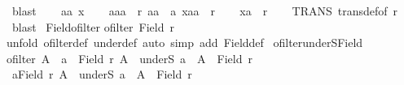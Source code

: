 \begin{isabellebody}
\ blast\isanewline
{}\isamarkupfalse%
\isanewline
\ \ \isamarkupfalse%
\ aa\ x\isanewline
\ \ \isamarkupfalse%
\ {\isachardoublequoteopen}{\isacharparenleft}{\kern0pt}aa{\isacharcomma}{\kern0pt}a{\isacharparenright}{\kern0pt}\ {\isasymin}\ r{\isachardoublequoteclose}\ {\isachardoublequoteopen}aa\ {\isasymnoteq}\ a{\isachardoublequoteclose}\ {\isachardoublequoteopen}{\isacharparenleft}{\kern0pt}x{\isacharcomma}{\kern0pt}aa{\isacharparenright}{\kern0pt}\ {\isasymin}\ r{\isachardoublequoteclose}\isanewline
\ \ \isamarkupfalse%
\ {\isachardoublequoteopen}{\isacharparenleft}{\kern0pt}x{\isacharcomma}{\kern0pt}a{\isacharparenright}{\kern0pt}\ {\isasymin}\ r{\isachardoublequoteclose}\isanewline
\ \ \isamarkupfalse%
\ TRANS\ trans{\isacharunderscore}{\kern0pt}def{\isacharbrackleft}{\kern0pt}of\ r{\isacharbrackright}{\kern0pt}\ \isamarkupfalse%
\ blast\isanewline
{}\isamarkupfalse%
%
\endisatagproof
{\isafoldproof}%
%
\isadelimproof
\isanewline
%
\endisadelimproof
\isanewline
{}\isamarkupfalse%
\ Field{\isacharunderscore}{\kern0pt}ofilter{\isacharcolon}{\kern0pt}\isanewline
{\isachardoublequoteopen}ofilter\ {\isacharparenleft}{\kern0pt}Field\ r{\isacharparenright}{\kern0pt}{\isachardoublequoteclose}\isanewline
%
\isadelimproof
%
\endisadelimproof
%
\isatagproof
{}\isamarkupfalse%
{\isacharparenleft}{\kern0pt}unfold\ ofilter{\isacharunderscore}{\kern0pt}def\ under{\isacharunderscore}{\kern0pt}def{\isacharcomma}{\kern0pt}\ auto\ simp\ add{\isacharcolon}{\kern0pt}\ Field{\isacharunderscore}{\kern0pt}def{\isacharparenright}{\kern0pt}%
\endisatagproof
{\isafoldproof}%
%
\isadelimproof
\isanewline
%
\endisadelimproof
\isanewline
{}\isamarkupfalse%
\ ofilter{\isacharunderscore}{\kern0pt}underS{\isacharunderscore}{\kern0pt}Field{\isacharcolon}{\kern0pt}\isanewline
{\isachardoublequoteopen}ofilter\ A\ {\isacharequal}{\kern0pt}\ {\isacharparenleft}{\kern0pt}{\isacharparenleft}{\kern0pt}{\isasymexists}a\ {\isasymin}\ Field\ r{\isachardot}{\kern0pt}\ A\ {\isacharequal}{\kern0pt}\ underS\ a{\isacharparenright}{\kern0pt}\ {\isasymor}\ {\isacharparenleft}{\kern0pt}A\ {\isacharequal}{\kern0pt}\ Field\ r{\isacharparenright}{\kern0pt}{\isacharparenright}{\kern0pt}{\isachardoublequoteclose}\isanewline
%
\isadelimproof
%
\endisadelimproof
%
\isatagproof
{}\isamarkupfalse%
\isanewline
\ \ \isamarkupfalse%
\ {\isachardoublequoteopen}{\isacharparenleft}{\kern0pt}{\isasymexists}a{\isasymin}Field\ r{\isachardot}{\kern0pt}\ A\ {\isacharequal}{\kern0pt}\ underS\ a{\isacharparenright}{\kern0pt}\ {\isasymor}\ A\ {\isacharequal}{\kern0pt}\ Field\ r{\isachardoublequoteclose}\isanewline

\end{isabellebody}

